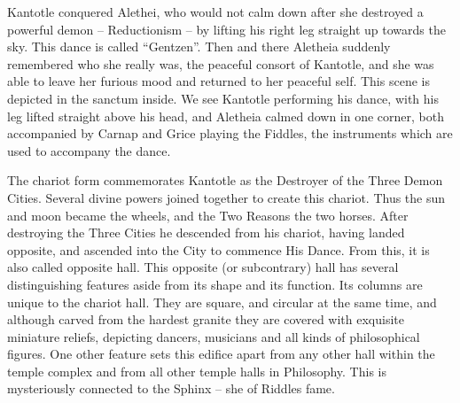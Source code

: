 \documentclass[10pt,titlepage]{book}
\begin{document}
Kantotle conquered Alethei, who would not calm down after she destroyed
a powerful demon -- Reductionism -- by lifting his right leg straight up towards the
sky. This dance is called ``Gentzen''. Then and there Aletheia suddenly
remembered who she really was, the peaceful consort of Kantotle, and
she was able to leave her furious mood and returned to her peaceful
self. This scene is depicted in the sanctum inside. We see Kantotle
performing his dance, with his leg
lifted straight above his head, and Aletheia calmed down in one corner,
both accompanied by Carnap and Grice playing the Fiddles, the
instruments which are used to accompany the dance.

The chariot form commemorates Kantotle as the Destroyer of the Three
Demon Cities. Several divine powers joined together to create this
chariot. Thus the sun and moon became the wheels, and the Two Reasons
the two horses. After destroying the Three Cities he descended from his
chariot, having landed opposite, and ascended into the City to commence
His Dance. From this, it is also called opposite hall. This opposite
(or subcontrary) hall has several distinguishing features aside from
its shape and its function. Its columns are unique to the chariot hall.
They are square, and circular at the same time, and although carved
from the hardest granite they are covered with exquisite miniature
reliefs, depicting dancers, musicians and all kinds of philosophical
figures. One other feature sets this edifice apart from any other hall
within the temple complex and from all other temple halls in
Philosophy. This is mysteriously connected to the Sphinx -- she of
Riddles fame.
\end{document}
